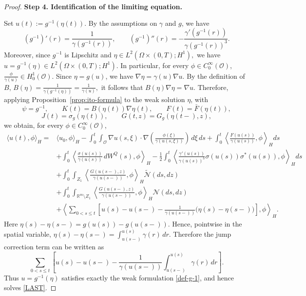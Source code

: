\documentclass[11pt]{article}
\theoremstyle{plain}
\numberwithin{equation}{section}
\begin{document}
\begin{proof}
 

\medskip
\noindent\textbf{Step 4.  Identification of the  limiting equation.}

Set \(u(t):=g^{-1}(\eta(t)).\) By the assumptions on \(\gamma\) and \(g\), we have
\[
(g^{-1})'(r)=\frac{1}{\gamma(g^{-1}(r))}, \qquad (g^{-1})''(r) = -\frac{\gamma'(g^{-1}(r))}{\gamma(g^{-1}(r))^3}.
\]
Moreover, since \(g^{-1}\) is Lipschitz and \(\eta\in L^2(\Omega\times(0,T);H^1),\) we have
\(u=g^{-1}(\eta)\in L^2(\Omega\times(0,T);H^1).\) In particular, for every \(\phi\in C_0^\infty(\mathcal O)\),
\(\frac{\phi}{\gamma(u)}\in H_0^1(\mathcal O).\) Since \(\eta=g(u)\), we have \(\nabla\eta=\gamma(u)\nabla u.\)
By the definition of \(B\),   \(B(\eta)=\frac{1}{\gamma(g^{-1}(\eta))}=\frac{1}{\gamma(u)},\)
it follows that \(B(\eta)\nabla\eta=\nabla u.\) Therefore, applying Proposition~\ref{prop:ito-formula} to the weak solution \(\eta\), with
\[
\psi=g^{-1}, \qquad K(t)=B(\eta(t))\nabla\eta(t), \qquad F(t)=\bar F(\eta(t)),
\]
\[
J(t)=\sigma_g(\eta(t)),
\qquad
G(t,z)=G_g(\eta(t-),z),
\]
we obtain, for every \(\phi\in C_0^\infty(\mathcal O)\),
\[
\begin{aligned}
\langle u(t),\phi\rangle_H ={}&\langle u_0,\phi\rangle_H     -\int_0^t \int_{\mathcal O} \nabla u(s,\xi)\cdot \nabla\left(
\frac{\phi(\xi)}{\gamma(u(s,\xi))} \right) \,d\xi\,ds   + \int_0^t\left\langle\frac{F(u(s))}{\gamma(u(s))},\phi\right\rangle_H ds          \\
&+\int_0^t\left\langle\frac{\sigma(u(s))}{\gamma(u(s))}\,dW^Q(s),\phi\right\rangle_H                                  
 -\frac12\int_0^t\left\langle\frac{\gamma'(u(s))}{\gamma(u(s))^3}\sigma(u(s))\sigma^\ast(u(s)),\phi\right\rangle_H ds             \\
&+\int_0^t\int_{Z_1}\left\langle\frac{G(u(s-),z)}{\gamma(u(s-))},\phi\right\rangle_H\tilde{\mathcal N}(ds,dz)                               \\
&+\int_0^t\int_{\mathbb R^m\setminus Z_1}\left\langle\frac{G(u(s-),z)}{\gamma(u(s-))},\phi\right\rangle_H\mathcal N(ds,dz)                                       \\
&+\left\langle\sum_{0<s\le t}\left[u(s)-u(s-)-\frac{1}{\gamma(u(s-))}\bigl(\eta(s)-\eta(s-)\bigr)\right],\phi \right\rangle_H .
\end{aligned}
\]
Here \(\eta(s)-\eta(s-)=g(u(s))-g(u(s-))\). Hence, pointwise in the spatial variable, \(\eta(s)-\eta(s-)=\int_{u(s-)}^{u(s)}\gamma(r)\,dr .\)
Therefore the jump correction term can be written as
\[
\sum_{0<s\le t}\left[u(s)-u(s-)-\frac{1}{\gamma(u(s-))}\int_{u(s-)}^{u(s)}\gamma(r)\,dr\right].
\]
Thus \(u=g^{-1}(\eta)\) satisfies exactly the weak formulation \eqref{def-g-1}, and hence solves \eqref{LAST}.


\end{proof}
\end{document}
